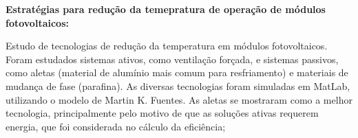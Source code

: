 
\textbf{Estratégias para redução da temepratura de operação de módulos
fotovoltaicos:}

Estudo de tecnologias de redução da temperatura em módulos fotovoltaicos. Foram
estudados sistemas ativos, como ventilação forçada, e sistemas passivos,  como
aletas (material de alumínio mais comum para resfriamento) e materiais de
mudança de fase (parafina). As diversas tecnologias foram simuladas em MatLab,
utilizando o modelo de Martin K. Fuentes. As aletas se mostraram como a melhor
tecnologia, principalmente pelo motivo de que as soluções ativas requerem
energia, que foi considerada no cálculo da eficiência;
